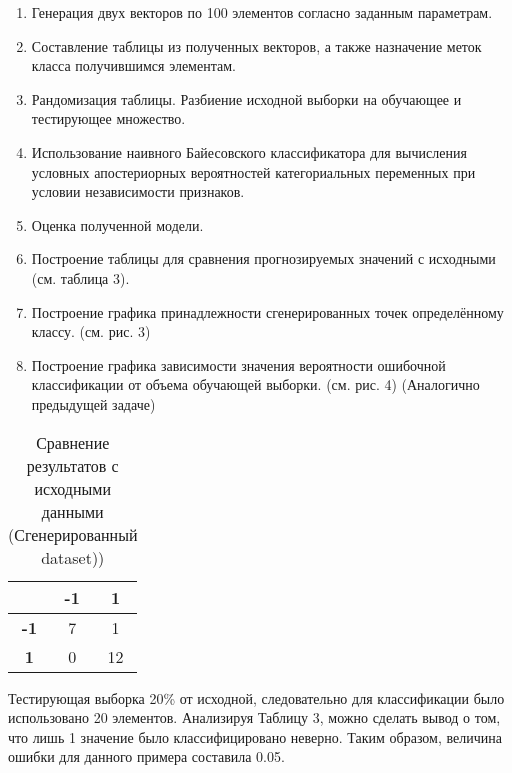 \documentclass[]{article}
\numberwithin{equation}{section}
\begin{document}
        \begin{enumerate}
            \item Генерация двух векторов по 100 элементов согласно заданным параметрам.
            \item Составление таблицы из полученных векторов, а также назначение меток класса получившимся элементам.
            \item Рандомизация таблицы.
            Разбиение исходной выборки на обучающее и тестирующее множество.
            \item Использование наивного Байесовского классификатора для вычисления условных апостериорных вероятностей категориальных переменных при условии независимости признаков.
            \item Оценка полученной модели.
            \item Построение таблицы для сравнения прогнозируемых значений с исходными (см. таблица 3).
            \item Построение графика принадлежности сгенерированных точек определённому классу. (см. рис. 3)
            \item Построение графика зависимости значения вероятности ошибочной классификации от объема обучающей выборки. (см. рис. 4) (Аналогично предыдущей задаче)
        \end{enumerate}

        \begin{table}[H]
            \centering
            \begin{tabular}{|c|c|c|}
              \hline
                & \textbf{-1} & \textbf{1} \\
              \hline
              \textbf{-1} & 7 & 1\\
              \hline
              \textbf{1} & 0 & 12 \\
              \hline
            \end{tabular}
            \caption{Сравнение результатов с исходными данными (Сгенерированный dataset))}
        \end{table}

        Тестирующая выборка 20\% от исходной, следовательно для классификации было использовано 20 элементов. Анализируя Таблицу 3, можно сделать вывод о том, что лишь 1 значение было классифицировано неверно. Таким образом, величина ошибки для данного примера составила 0.05.

\end{document}
